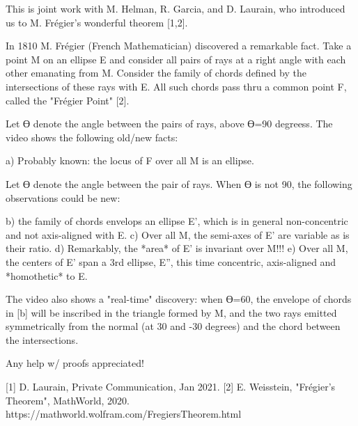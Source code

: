 This is joint work with M. Helman, R. Garcia, and D. Laurain, who introduced us to M. Frégier's wonderful theorem [1,2].

In 1810 M. Frégier (French Mathematician) discovered a remarkable fact. Take a point M on an ellipse E and consider all pairs of rays at a right angle with each other emanating from M. Consider the family of chords defined by the intersections of these rays with E. All such chords pass thru a common point F, called the "Frégier Point" [2].

Let ϴ denote the angle between the pairs of rays, above ϴ=90 degreess. The video shows the following old/new facts:

a) Probably known: the locus of F over all M is an ellipse.

Let ϴ denote the angle between the pair of rays. When ϴ is not 90, the following observations could be new:

b) the family of chords envelops an ellipse E', which is in general non-concentric and not axis-aligned with E.
c) Over all M, the semi-axes of E' are variable as is their ratio.
d) Remarkably, the *area* of E' is invariant over M!!!
e) Over all M, the centers of E' span a 3rd ellipse, E'', this time concentric, axis-aligned and *homothetic* to E.

The video also shows a "real-time" discovery: when ϴ=60, the envelope of chords in [b] will be inscribed in the triangle formed by M, and the two rays emitted symmetrically from the normal (at 30 and -30 degrees) and the chord between the intersections.

Any help w/ proofs appreciated!

[1] D. Laurain, Private Communication, Jan 2021. 
[2] E. Weisstein, "Frégier's Theorem", MathWorld, 2020. https://mathworld.wolfram.com/FregiersTheorem.html